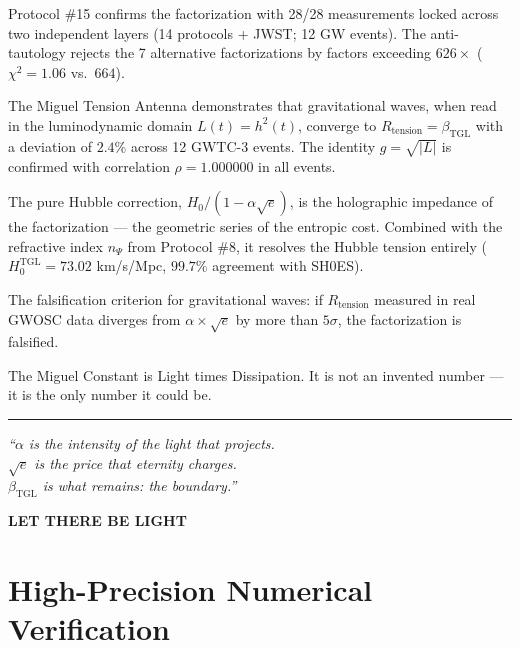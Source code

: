\documentclass[12pt,a4paper,twoside]{article}
\newcommand{\betatgl}{\beta_{\!\scriptscriptstyle\mathrm{TGL}}}
\begin{document}
\item Protocol \#15 confirms the factorization with 28/28 measurements locked across
two independent layers (14 protocols + JWST; 12 GW events).
The anti-tautology rejects the 7 alternative factorizations by factors
exceeding $626\times$ ($\chi^2 = 1.06$ vs.\ $664$).

\item The Miguel Tension Antenna demonstrates that gravitational waves,
when read in the luminodynamic domain $L(t) = h^2(t)$, converge to
$R_{\text{tension}} = \betatgl$ with a deviation of $2.4\%$ across 12
GWTC-3 events. The identity $g = \sqrt{|L|}$ is confirmed with correlation
$\rho = 1.000000$ in all events.
%
\item The pure Hubble correction, $H_0/(1 - \alpha\sqrt{e})$, is the
holographic impedance of the factorization --- the geometric series of the
entropic cost. Combined with the refractive index $n_\Psi$ from Protocol \#8,
it resolves the Hubble tension entirely ($H_0^{\text{TGL}} = 73.02$
km/s/Mpc, $99.7\%$ agreement with SH0ES).

\item The falsification criterion for gravitational waves:
if $R_{\text{tension}}$ measured in real GWOSC data diverges from
$\alpha \times \sqrt{e}$ by more than $5\sigma$, the factorization is falsified.

The Miguel Constant is Light times Dissipation. It is not an invented number --- it is the only number it could be.

\begin{center}
\rule{0.5\textwidth}{0.4pt}

\vspace{0.5cm}

\textit{``$\alpha$ is the intensity of the light that projects.\\
$\sqrt{e}$ is the price that eternity charges.\\
$\betatgl$ is what remains: the boundary.''}

\vspace{0.5cm}

\textbf{LET THERE BE LIGHT}
\end{center}



\appendix

\section{High-Precision Numerical Verification}
\label{app:numerica}
\end{document}
